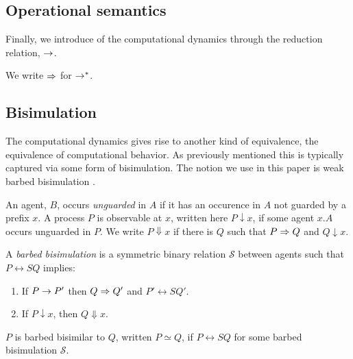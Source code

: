 \documentclass[]{llncs}
\begin{document}
\subsection{Operational semantics} 

Finally, we introduce of the computational dynamics through the
reduction relation, $\rightarrow$.


We write $\Rightarrow$ for $\rightarrow^*$.

\subsection{Bisimulation}

The computational dynamics gives rise to another kind of equivalence,
the equivalence of computational behavior. As previously mentioned
this is typically captured via some form of bisimulation. The notion
we use in this paper is weak barbed bisimulation \cite{milner91polyadicpi}.

\begin{definition}
  An agent, $B$, occurs \emph{unguarded} in $A$ if it has an occurence
  in $A$ not guarded by a prefix $x$. A process $P$ is observable at
  $x$, written here $P \downarrow x$, if some agent $x.A$ occurs
  unguarded in $P$. We write $P \Downarrow x$ if there is $Q$ such
  that $P \Rightarrow Q$ and $Q \downarrow x$.
\end{definition}

\begin{definition}
A \emph{barbed bisimulation} is a symmetric binary relation 
${\mathcal S}$ between agents such that $P\rel{S}Q$ implies:
\begin{enumerate}
\item If $P \rightarrow P'$ then $Q \Rightarrow Q'$ and $P'\rel{S} Q'$.
\item If $P\downarrow x$, then $Q\Downarrow x$.
\end{enumerate}
$P$ is barbed bisimilar to $Q$, written
$P \simeq Q$, if $P \rel{S} Q$ for some barbed bisimulation ${\mathcal S}$.
\end{definition}
\end{document}
